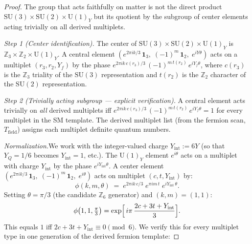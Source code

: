 \documentclass[11pt,a4paper]{article}
\theoremstyle{definition}
\newcommand{\SU}{\mathrm{SU}}
\newcommand{\U}{\mathrm{U}}
\begin{document}
\begin{proof}
The group that acts faithfully on matter is not the direct product
$\SU(3) \times \SU(2) \times \U(1)_Y$ but its quotient by the
subgroup of center elements acting trivially on all derived multiplets.

\textit{Step 1 (Center identification).}\quad
The center of $\SU(3) \times \SU(2) \times \U(1)_Y$ is
$\mathbb{Z}_3 \times \mathbb{Z}_2 \times \U(1)_Y$.  A central element
$(e^{2\pi i k/3}\,\mathbf{1}_3,\; (-1)^m\,\mathbf{1}_2,\;
e^{iY\theta})$ acts on a multiplet $(r_3, r_2, Y_f)$ by the phase
$e^{2\pi i k\, c(r_3)/3}\, (-1)^{m\, t(r_2)}\, e^{iY_f\theta}$,
where $c(r_3)$ is the $\mathbb{Z}_3$ triality of the $\SU(3)$
representation and $t(r_2)$ is the $\mathbb{Z}_2$ character of the
$\SU(2)$ representation.

\textit{Step 2 (Trivially acting subgroup --- explicit verification).}\quad
A central element acts trivially on \emph{all} derived multiplets iff
$e^{2\pi i k\, c(r_3)/3}\, (-1)^{m\, t(r_2)}\, e^{iY_f\theta} = 1$
for every multiplet in the SM template.  The derived multiplet list
(from the fermion scan, $T_{\mathrm{field}}$) assigns each multiplet
definite quantum numbers.

\textit{Normalization.}\quad We work with the integer-valued charge
$Y_{\mathrm{int}} := 6Y$ (so that $Y_Q = 1/6$ becomes
$Y_{\mathrm{int}} = 1$, etc.).  The $\U(1)_Y$ element $e^{i\theta}$
acts on a multiplet with charge $Y_{\mathrm{int}}$ by the phase
$e^{iY_{\mathrm{int}}\theta}$.  A center element
$(e^{2\pi i k/3}\,\mathbf{1}_3,\; (-1)^m\,\mathbf{1}_2,\;
e^{i\theta})$ acts on multiplet $(c, t, Y_{\mathrm{int}})$ by:
\begin{equation}\label{eq:center_phase}
  \phi(k,m,\theta) \;=\; e^{2\pi i k\, c/3}\;
  e^{\pi i m\, t}\; e^{i Y_{\mathrm{int}}\,\theta}.
\end{equation}
Setting $\theta = \pi/3$ (the candidate $\mathbb{Z}_6$ generator)
and $(k, m) = (1, 1)$:
\[
  \phi\bigl(1,1,\tfrac{\pi}{3}\bigr) = \exp\Bigl[\,
  i\pi\,\frac{2c + 3t + Y_{\mathrm{int}}}{3}\Bigr].
\]
This equals $1$ iff $2c + 3t + Y_{\mathrm{int}} \equiv 0 \pmod{6}$.
We verify this for every multiplet type in one generation of the
derived fermion template:


\end{proof}
\end{document}
